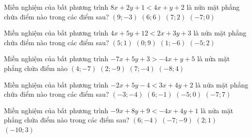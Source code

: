 \begin{ex}
 Miền nghiệm của bất phương trình $8 x + 2 y + 1< 4 x + y + 2$ là nửa mặt phẳng chứa điểm nào trong các điểm sau?
\choice
{ $(9; -3)$ }
   { $(6; 6)$ }
     { $(7; 2)$ }
    { \True $(-7; 0)$ }
\end{ex}

\begin{ex}
 Miền nghiệm của bất phương trình $4 x + 5 y + 12< 2 x + 3 y + 3$ là nửa mặt phẳng chứa điểm nào trong các điểm sau?
\choice
{ $(5; 1)$ }
   { $(0; 9)$ }
     { \True $(1; -6)$ }
    { $(-5; 2)$ }
\end{ex}

\begin{ex}
 Miền nghiệm của bất phương trình $- 7 x + 5 y + 3> - 4 x + y + 5$ là nửa mặt phẳng chứa điểm nào
\choice
{ $(4; -7)$ }
   { $(2; -9)$ }
     { $(7; -4)$ }
    { \True $(-8; 4)$ }
\end{ex}

\begin{ex}
 Miền nghiệm của bất phương trình $- 2 x + 5 y - 4< 3 x + 4 y + 2$ là nửa mặt phẳng chứa điểm nào trong các điểm sau?
\choice
{ $(-3; -4)$ }
   { \True $(6; -1)$ }
     { $(-5; 0)$ }
    { $(-7; 7)$ }
\end{ex}

\begin{ex}
 Miền nghiệm của bất phương trình $- 9 x + 8 y + 9< - 4 x + 4 y + 1$ là nửa mặt phẳng chứa điểm nào trong các điểm sau?
\choice
{ \True $(6; -4)$ }
   { $(-7; -9)$ }
     { $(2; 1)$ }
    { $(-10; 3)$ }
\end{ex}

